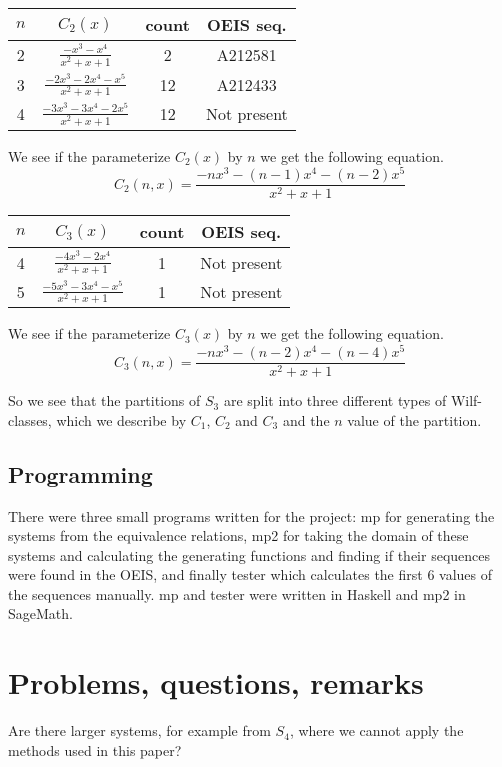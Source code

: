 \documentclass[a4paper, 11pt]{article}
\theoremstyle{definition}
\newcommand{\Sym}{S}
\begin{document}
\begin{center}
\begin{tabular}{c|c|c|c}
    $n$ & $C_2(x)$ & count & OEIS seq. \\
    \hline
    2 & $\frac{-x^3-x^4}{x^2+x+1}$ & 2 & A212581 \\
    3 & $\frac{-2x^3-2x^4-x^5}{x^2+x+1}$ & 12 & A212433 \\
    4 & $\frac{-3x^3-3x^4-2x^5}{x^2+x+1}$ & 12 & Not present\\
\end{tabular}
\end{center}
We see if the parameterize $C_2(x)$ by $n$ we get the following equation.
\[
    C_2(n,x) = \frac{-nx^3-(n-1)x^4-(n-2)x^5}{x^2+x+1}
\]

\begin{center}
\begin{tabular}{c|c|c|c}
    $n$ & $C_3(x)$ & count & OEIS seq. \\
    \hline
    4 & $\frac{-4x^3-2x^4}{x^2+x+1}$ & 1 & Not present \\ 
    5 & $\frac{-5x^3-3x^4-x^5}{x^2+x+1}$ & 1 & Not present\\
\end{tabular}
\end{center}
We see if the parameterize $C_3(x)$ by $n$ we get the following equation.
\[
    C_3(n,x) = \frac{-nx^3-(n-2)x^4-(n-4)x^5}{x^2+x+1}
\]

So we see that the partitions of $\Sym_3$ are split into three different types
of Wilf-classes, which we describe by $C_1$, $C_2$ and $C_3$ and the $n$ value
of the partition.

\subsection{Programming}
There were three small programs written for the project: mp for generating the
systems from the equivalence relations, mp2 for taking the domain of these
systems and calculating the generating functions and finding if their sequences
were found in the OEIS, and finally tester which calculates the first 6 values
of the sequences manually. mp and tester were written in Haskell and mp2 in SageMath. 


\section{Problems, questions, remarks}
Are there larger systems, for example from $\Sym_4$, where we cannot apply the
methods used in this paper?
\end{document}
